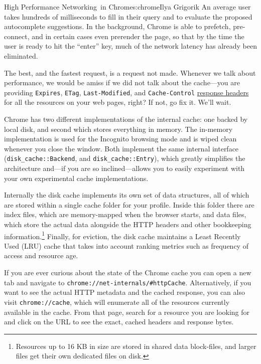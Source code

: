 \begin{aosachapter}{High Performance Networking~in Chrome}{s:chrome}{Ilya Grigorik}
An average user takes hundreds of milliseconds to fill in their query
and to evaluate the proposed autocomplete suggestions. In the
background, Chrome is able to prefetch, pre-connect, and in certain
cases even prerender the page, so that by the time the user is ready to
hit the ``enter'' key, much of the network latency has already been
eliminated.


The best, and the fastest request, is a request not made. Whenever we
talk about performance, we would be amiss if we did not talk about the
cache---you are providing \texttt{Expires}, \texttt{ETag},
\texttt{Last-Modified}, and \texttt{Cache-Control}
\href{https://developers.google.com/speed/docs/best-practices/caching}{response
headers} for all the resources on your web pages, right? If not, go fix
it. We'll wait.

Chrome has two different implementations of the internal cache: one
backed by local disk, and second which stores everything in memory. The
in-memory implementation is used for the Incognito browsing mode and is
wiped clean whenever you close the window. Both implement the same
internal interface (\texttt{disk\_cache::Backend}, and
\texttt{disk\_cache::Entry}), which greatly simplifies the architecture
and---if you are so inclined---allows you to easily experiment with your
own experimental cache implementations.

Internally the disk cache implements its own set of data structures, all
of which are stored within a single cache folder for your profile.
Inside this folder there are index files, which are memory-mapped when
the browser starts, and data files, which store the actual data
alongside the HTTP headers and other bookkeeping information.\footnote{Resources
  up to 16 KB in size are stored in shared data block-files, and larger
  files get their own dedicated files on disk.} Finally, for eviction,
the disk cache maintains a Least Recently Used (LRU) cache that takes
into account ranking metrics such as frequency of access and resource
age.


If you are ever curious about the state of the Chrome cache you can open
a new tab and navigate to \texttt{chrome://net-internals/\#httpCache}.
Alternatively, if you want to see the actual HTTP metadata and the
cached response, you can also visit \texttt{chrome://cache}, which will
enumerate all of the resources currently available in the cache. From
that page, search for a resource you are looking for and click on the
URL to see the exact, cached headers and response bytes.


\end{aosachapter}
